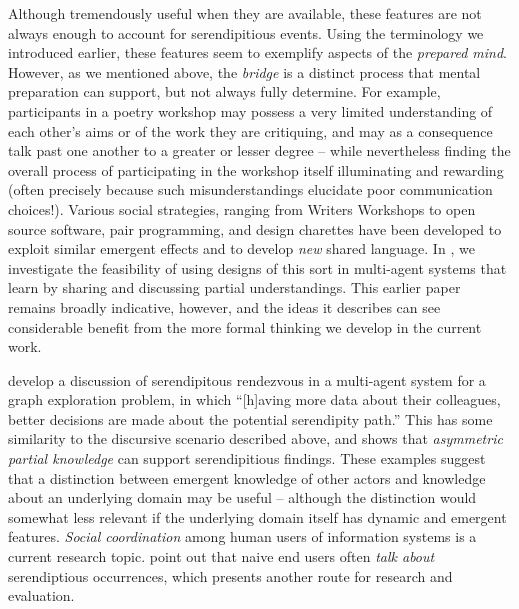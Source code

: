 Although tremendously useful when they are available, these features
are not always enough to account for serendipitious events.  Using the
terminology we introduced earlier, these features seem to exemplify
aspects of the \emph{prepared mind}.  However, as we mentioned above,
the \emph{bridge} is a distinct process that mental preparation can
support, but not always fully determine.  For example, participants in
a poetry workshop may possess a very limited understanding of each
other's aims or of the work they are critiquing, and may as a
consequence talk past one another to a greater or lesser degree --
while nevertheless finding the overall process of participating in the
workshop itself illuminating and rewarding (often precisely because
such misunderstandings elucidate poor communication choices!).
Various social strategies, ranging from Writers Workshops to open
source software, pair programming, and design charettes
\cite[p. 11]{gabriel2002writer} have been developed to exploit similar
emergent effects and to develop \emph{new} shared language.  In
\cite{poetry-workshop}, we investigate the feasibility of using
designs of this sort in multi-agent systems that learn by sharing and
discussing partial understandings.  This earlier paper remains broadly
indicative, however, and the ideas it describes can see considerable
benefit from the more formal thinking we develop in the current work.

 develop a discussion of serendipitous
rendezvous in a multi-agent system for a graph exploration problem, in
which ``[h]aving more data about their colleagues, better decisions
are made about the potential serendipity path.''  This has some
similarity to the discursive scenario described above, and shows that
\emph{asymmetric partial knowledge} can support serendipitious
findings.  These examples suggest that a distinction between emergent
knowledge of other actors and knowledge about an underlying domain may
be useful -- although the distinction would somewhat less relevant if
the underlying domain itself has dynamic and emergent features.
\emph{Social coordination} among human users of information systems is
a current research topic.  point out that
naive end users often \emph{talk about} serendiptious occurrences,
which presents another route for research and evaluation.

